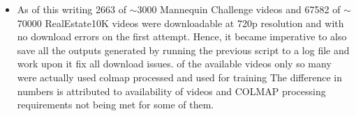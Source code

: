 \begin{itemize}
    \item As of this writing 2663 of $\sim$3000 Mannequin Challenge videos and 67582 of $\sim$70000 RealEstate10K videos were downloadable at 720p resolution and with no download errors on the first attempt. Hence, it became imperative to also save all the outputs generated by running the previous script to a log file and work upon it fix all download issues.
    of the available videos only so many were actually used colmap processed and used for training 
    The difference in numbers is attributed to availability of videos and COLMAP processing requirements not being met for some of them.

    
    
    
    
    
\end{itemize}









